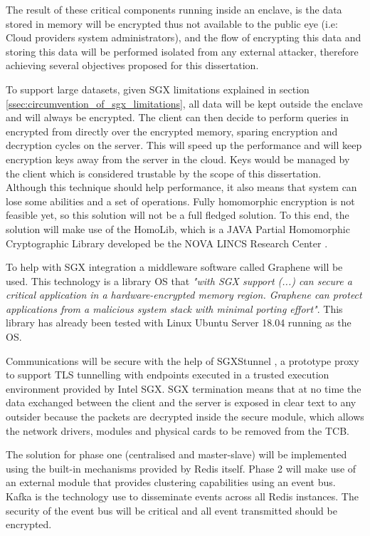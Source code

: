 The result of these critical components running inside an enclave, is the data stored in memory will be encrypted thus not available to the public eye (i.e: Cloud providers system administrators), and the flow of encrypting this data and storing this data will be performed isolated from any external attacker, therefore achieving several objectives proposed for this dissertation.

To support large datasets, given \gls{SGX} limitations explained in section \ref{ssec:circumvention_of_sgx_limitations}, all data will be kept outside the enclave and will always be encrypted. The client can then decide to perform queries in encrypted from directly over the encrypted memory, sparing encryption and decryption cycles on the server. This will speed up the performance and will keep encryption keys away from the server in the cloud. Keys would be managed by the client which is considered trustable by the scope of this dissertation. Although this technique should help performance, it also means that system can lose some abilities and a set of operations. Fully homomorphic encryption is not feasible yet, so this solution will not be a full fledged solution. To this end, the solution will make use of the HomoLib, which is a JAVA Partial Homomorphic Cryptographic Library developed be the NOVA LINCS Research Center \cite{homolib:1}.

To help with \gls{SGX} integration a middleware software called Graphene \cite{graphene:1, graphene:2} will be used. This technology is a library \gls{OS} that \textit{"with \gls{SGX} support (...) can secure a critical application in a hardware-encrypted memory region. Graphene can protect applications from a malicious system stack with minimal porting effort"}. This library has already been tested with Linux Ubuntu Server 18.04 running as the \gls{OS}. 

Communications will be secure with the help of SGXStunnel \cite{sgxstunnel:1}, a prototype proxy to support TLS tunnelling with endpoints executed in a trusted execution environment provided by Intel SGX. \gls{SGX} termination means that at no time the data exchanged between the client and the server is exposed in clear text to any outsider because the packets are decrypted inside the secure module, which allows the network drivers, modules and physical cards to be removed from the \gls{TCB}.

The solution for phase one (centralised and master-slave) will be implemented using the built-in mechanisms provided by Redis itself. Phase 2 will make use of an external module that provides clustering capabilities using an event bus. Kafka \cite{kafka:1} is the technology use to disseminate events across all Redis instances. The security of the event bus will be critical and all event transmitted should be encrypted.


